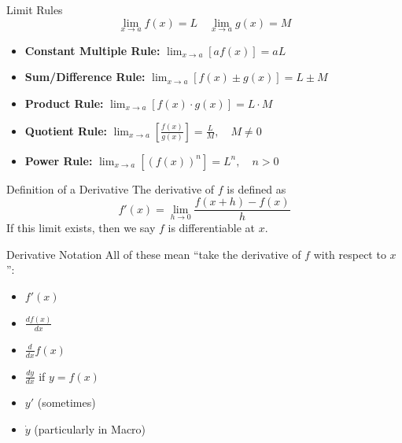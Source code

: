 \documentclass[aspectratio=169]{beamer}
\begin{document}
\begin{frame}{Limit Rules}\label{main1}
    \[
    \lim_{x \to a} f(x) = L \quad \lim_{x \to a} g(x) = M
    \]
    \vspace{1em}
    \begin{itemize}
        \item \textbf{Constant Multiple Rule:} \quad $\lim_{x \to a} [a f(x)] = a L$
        \item \textbf{Sum/Difference Rule:} \quad $\lim_{x \to a} [f(x) \pm g(x)] = L \pm M$
        \item \textbf{Product Rule:} \quad $\lim_{x \to a} [f(x) \cdot g(x)] = L \cdot M$
        \item \textbf{Quotient Rule:} \quad $\lim_{x \to a} \left[ \frac{f(x)}{g(x)} \right] = \frac{L}{M}, \quad M \neq 0$
        \item \textbf{Power Rule:} \quad $\lim_{x \to a} [(f(x))^n] = L^n, \quad n > 0$
    \end{itemize}
\end{frame}

\begin{frame}{Definition of a Derivative}\label{main1}
The derivative of \(f\) is defined as
\[
f'(x) = \lim_{h \to 0} \frac{f(x + h) - f(x)}{h}
\]
If this limit exists, then we say \(f\) is differentiable at \(x\).

\end{frame}

\begin{frame}{Derivative Notation}\label{main1}
All of these mean “take the derivative of \(f\) with respect to \(x\)”:
\begin{itemize}
\begin{itemize}
    \item \(f'(x)\)
    \item \(\frac{df(x)}{dx}\)
    \item \(\frac{d}{dx} f(x)\)
    \item \(\frac{dy}{dx}\) if \(y = f(x)\)
    \item \(y'\) (sometimes)
    \item \( \dot{y} \) (particularly in Macro)
\end{itemize}
\end{itemize}
\end{frame}
\end{document}

